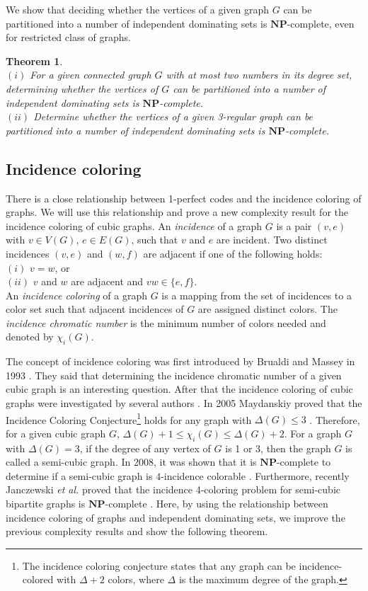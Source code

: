 \documentclass[
final
]{dmtcs-episciences}
\newtheorem{prethm}{{\bf Theorem}}
\newenvironment{thm}{\begin{prethm}{\hspace{-0.5
				em}{\bf}}}{\end{prethm}}
\begin{document}
We show that deciding whether the vertices of a given  graph $G$ can be partitioned into a number of  independent dominating sets is  $ \mathbf{NP} $-complete, even for restricted class of graphs.

\begin{thm}\label{thm4}
	\\
	$(i)$ For a given connected graph $G$ with at most two numbers in its degree set, determining  whether the vertices of $G$ can be partitioned into a number of independent dominating sets is  $ \mathbf{NP} $-complete.\\
	$(ii)$ Determine  whether the vertices of a given  3-regular graph can be partitioned into a number of independent dominating sets is  $ \mathbf{NP} $-complete.
\end{thm}


\subsection{Incidence coloring}

There is a close relationship between 1-perfect codes and the incidence coloring of graphs. We will use this relationship and prove a new complexity result for  the incidence coloring of  cubic graphs.
An {\it incidence} of a graph $G$ is a pair $(v, e)$ with $v \in V(G)$, $e \in E(G)$, such that $v$ and $e$ are
incident. Two distinct incidences $(v, e)$ and $(w, f )$ are adjacent if one of the following holds:\\
$(i)$ $v = w$, or\\
$(ii)$ $v$ and $w$ are adjacent and $vw \in\{e, f \}$.\\
An {\it incidence coloring} of a graph
$G$ is a mapping from the set of incidences to a color set such that adjacent incidences of
$G$ are assigned distinct colors. The {\it incidence chromatic number} is the minimum number of
colors needed and denoted by $\chi_i(G)$.

The concept of incidence coloring was first introduced by Brualdi and   Massey  in 1993 \cite{Kh2}. They said that
determining the incidence chromatic number of a given  cubic graph is an interesting question. After that the incidence coloring of cubic graphs were investigated by several authors \cite{Kh5, MR3636883, Kh4, Kh6}.
In 2005 Maydanskiy proved that the Incidence Coloring Conjecture\footnote{The incidence coloring conjecture  states that any graph can be incidence-colored with
	$\Delta+2$ colors, where $\Delta$ is the maximum degree of the graph.} holds for any graph with
$\Delta(G)\leq 3$ \cite{Kh4}. Therefore, for  a given cubic graph $G$, $\Delta(G)+1 \leq \chi_i(G) \leq \Delta(G)+2 $.
For a graph $G$ with $\Delta(G)=3$, if the degree of any vertex of $G$ is 1 or 3, then the graph $G$ is called a semi-cubic
graph. In 2008, it was shown that it is $ \mathbf{NP} $-complete to determine if a semi-cubic graph is $4$-incidence colorable \cite{Kh5}. 
Furthermore, recently Janczewski {\it et al.} proved that the incidence 4-coloring problem for semi-cubic bipartite graphs is $ \mathbf{NP} $-complete \cite{janczewski2017incidence}. 
Here, by using the relationship between 
incidence coloring of graphs and independent dominating sets,
we improve the previous complexity results  and show the following theorem.
\end{document}
